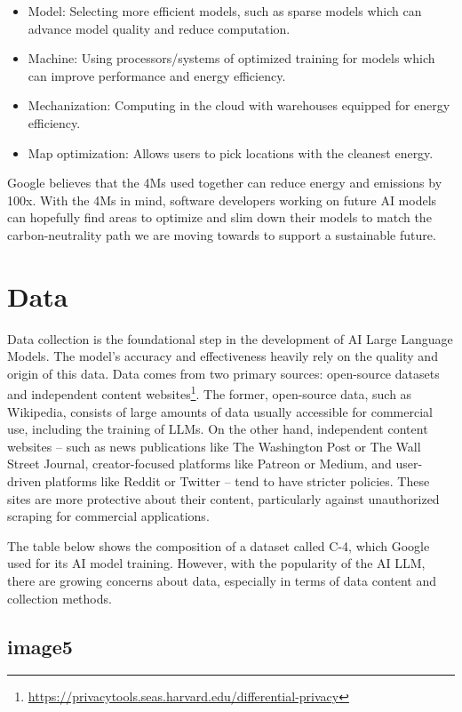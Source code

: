 \documentclass[
]{book}
\providecommand{\tightlist}{%
  \setlength{\itemsep}{0pt}\setlength{\parskip}{0pt}}
\begin{document}
\begin{itemize}
\tightlist
\item
  Model: Selecting more efficient models, such as sparse models which can advance model quality and reduce computation.
\item
  Machine: Using processors/systems of optimized training for models which can improve performance and energy efficiency.
\item
  Mechanization: Computing in the cloud with warehouses equipped for energy efficiency.
\item
  Map optimization: Allows users to pick locations with the cleanest energy.
\end{itemize}

Google believes that the 4Ms used together can reduce energy and emissions by 100x. With the 4Ms in mind, software developers working on future AI models can hopefully find areas to optimize and slim down their models to match the carbon-neutrality path we are moving towards to support a sustainable future.

\hypertarget{data}{%
\chapter{Data}\label{data}}

Data collection is the foundational step in the development of AI Large Language Models. The model's accuracy and effectiveness heavily rely on the quality and origin of this data. Data comes from two primary sources: open-source datasets and independent content websites\footnote{\url{https://privacytools.seas.harvard.edu/differential-privacy}}. The former, open-source data, such as Wikipedia, consists of large amounts of data usually accessible for commercial use, including the training of LLMs. On the other hand, independent content websites -- such as news publications like The Washington Post or The Wall Street Journal, creator-focused platforms like Patreon or Medium, and user-driven platforms like Reddit or Twitter -- tend to have stricter policies. These sites are more protective about their content, particularly against unauthorized scraping for commercial applications.

The table below shows the composition of a dataset called C-4, which Google used for its AI model training. However, with the popularity of the AI LLM, there are growing concerns about data, especially in terms of data content and collection methods.

\hypertarget{image5}{%
\section{image5}\label{image5}}
\end{document}
